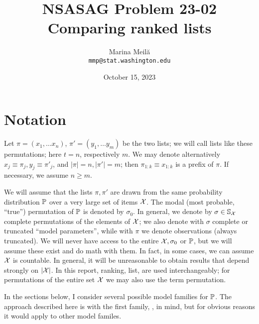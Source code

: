 \documentclass[10pt]{article}
\title{NSASAG Problem 23-02 Comparing ranked lists}
\author{Marina Meil\u{a}\\{\tt mmp@stat.washington.edu}}
\date{October 15, 2023}
\begin{document}
\maketitle


\section{Notation}
\label{sec:notation}

Let $\pi=(x_1,\ldots x_n)$, $\pi'=(y_1,\ldots y_m)$ be the two lists; we will call lists like these \topt permutations; here $t=n$, respectively $m$. We may denote alternatively $x_j\equiv \pi_j, y_j\equiv \pi'_j$, and $|\pi|=n,|\pi'|=m$; then $\pi_{1:k}\equiv x_{1:k}$ is a prefix of $\pi$. If necessary, we assume $n\geq m$. 

We will assume that the lists $\pi,\pi'$ are drawn from the same probability
distribution ${\mathbb P}$ over a very large set of items ${\mathcal X}$. The modal
 (most probable, ``true'') permutation of ${\mathbb P}$ is
denoted by $\sigma_0$. In general, we denote by $\sigma\in {\mathbb S}_{{\mathcal X}}$
complete permutations of the elements of ${\mathcal X}$; we also denote with $\sigma$ complete or truncated ``model parameters'', while with $\pi$ we denote observations (always truncated). We will never have access to the entire ${\mathcal X},\sigma_0$ or ${\mathbb P}$, but we will assume these exist and do math with them. In fact, in some cases, we can assume ${\mathcal X}$ is countable. In general, it will be unreasonable to obtain results that depend strongly on $|{\mathcal X}|$. 
 In this report, ranking, list, are used interchangeably; for permutations of the entire set ${\mathcal X}$ we may also use the term permutation.

In the sections below, I consider several possible model families for ${\mathbb P}$. The approach described here is with the first family, \gmms, in mind, but for obvious reasons it would apply to other model familes.
\end{document}
